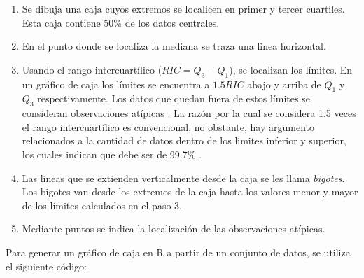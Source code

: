 \documentclass[
]{book}
\providecommand{\tightlist}{%
  \setlength{\itemsep}{0pt}\setlength{\parskip}{0pt}}
\begin{document}
\begin{enumerate}
\def\labelenumi{\arabic{enumi}.}
\tightlist
\item
  Se dibuja una caja cuyos extremos se localicen en primer y tercer cuartiles. Esta caja contiene 50\% de los datos centrales.
\item
  En el punto donde se localiza la mediana se traza una linea horizontal.
\item
  Usando el rango intercuartílico (\(RIC = Q_3-Q_1\)), se localizan los límites. En un gráfico de caja los límites se encuentra a \(1.5RIC\) abajo y arriba de \(Q_1\) y \(Q_3\) respectivamente. Los datos que quedan fuera de estos límites se consideran observaciones atípicas \citep{Tukey}. La razón por la cual se considera 1.5 veces el rango intercuartílico es convencional, no obstante, hay argumento relacionados a la cantidad de datos dentro de los limites inferior y superior, los cuales indican que debe ser de 99.7\% \citep{James2013}.
\item
  Las lineas que se extienden verticalmente desde la caja se les llama \emph{bigotes}. Los bigotes van desde los extremos de la caja hasta los valores menor y mayor de los límites calculados en el paso 3.
\item
  Mediante puntos se indica la localización de las observaciones atípicas.
\end{enumerate}

Para generar un gráfico de caja en R a partir de un conjunto de datos, se utiliza el siguiente código:
\end{document}

